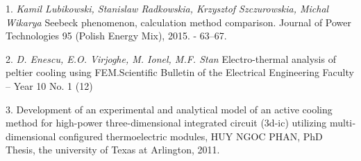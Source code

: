 \litlist

1. {\it Kamil Lubikowski, Stanislaw Radkowskia, Krzysztof
\linebreak
Szczurowskia, Michal Wikarya}
\foreignlanguage{english}{
	Seebeck phenomenon, calculation method comparison. Journal of Power Technologies 95 (Polish Energy Mix), 2015. - 63–67.
}

2. \foreignlanguage{english}{
	{\it D. Enescu, E.O. Virjoghe, M. Ionel, M.F. Stan} Electro-thermal analysis of peltier cooling using FEM.Scientific Bulletin of the Electrical Engineering Faculty – Year 10 No. 1 (12)
}

3. \foreignlanguage{english}{
	Development of an experimental and analytical model of an active cooling method for high-power three-dimensional integrated circuit (3d-ic) utilizing multidimensional configured thermoelectric modules, HUY NGOC PHAN, PhD Thesis, the university of Texas at Arlington, 2011.
}
